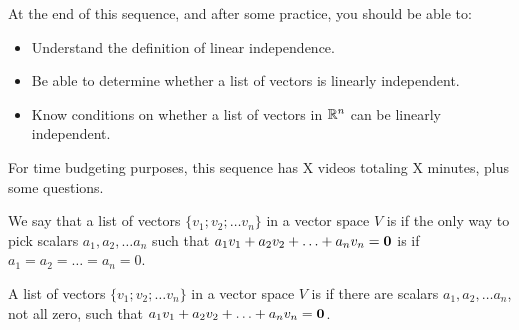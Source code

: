 

\usepackage{enumerate}







At the end of this sequence, and after some practice, you should be able to:

\begin{itemize}
\item Understand the definition of linear independence.  
\item Be able to determine whether a list of vectors is linearly independent. 
\item Know conditions on whether a list of vectors in $\mathbb R^n$ can be linearly independent.
\end{itemize}


For time budgeting purposes, this sequence has X videos totaling X minutes, 
plus some questions.  




\endedxtext

\endedxvertical







{} We say that a list of vectors $\{v_1; v_2; \ldots v_n\}$ in a vector space $V$ is 
{} if the only way to pick scalars $a_1, a_2, \ldots a_n$ such that
$a_1v_1 + a_2v_2 + \ldots + a_nv_n = \mathbf{0}$ is if $a_1 = a_2 = \ldots = a_n = 0$.  

{} A list of vectors $\{v_1; v_2; \ldots v_n\}$ in a vector space $V$ is 
{} if there are scalars $a_1, a_2, \ldots a_n$, not all zero, such that
$a_1v_1 + a_2v_2 + \ldots + a_nv_n = \mathbf{0}$.  


\endedxtext


